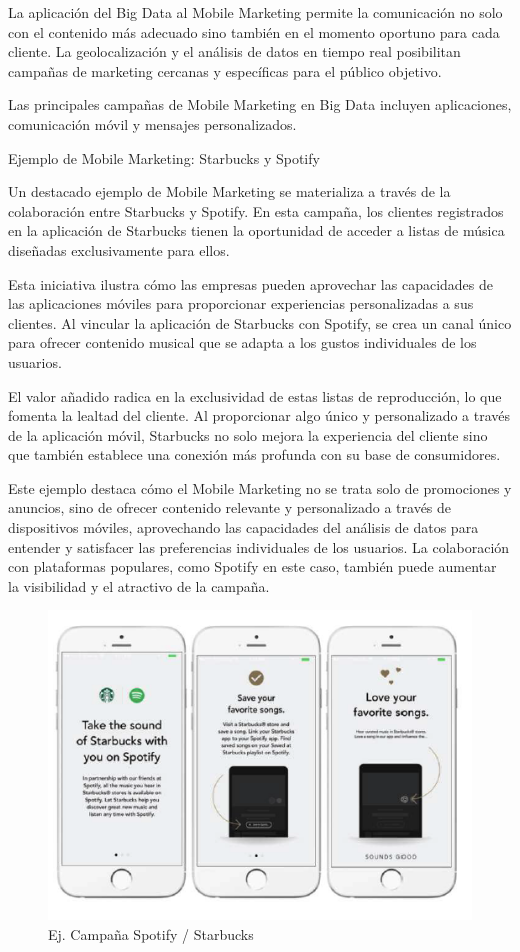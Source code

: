\documentclass[
    a4paper, %
    10pt, %
    unnumberedsections, %
    twoside, %
]{LTJournalArticle}
\begin{document}
La aplicación del Big Data al Mobile Marketing permite la comunicación no solo con el contenido más adecuado sino también en el momento oportuno para cada cliente. La geolocalización y el análisis de datos en tiempo real posibilitan campañas de marketing cercanas y específicas para el público objetivo.

Las principales campañas de Mobile Marketing en Big Data incluyen aplicaciones, comunicación móvil y mensajes personalizados.


Ejemplo de Mobile Marketing: Starbucks y Spotify

Un destacado ejemplo de Mobile Marketing se materializa a través de la colaboración entre Starbucks y Spotify. En esta campaña, los clientes registrados en la aplicación de Starbucks tienen la oportunidad de acceder a listas de música diseñadas exclusivamente para ellos.

Esta iniciativa ilustra cómo las empresas pueden aprovechar las capacidades de las aplicaciones móviles para proporcionar experiencias personalizadas a sus clientes. Al vincular la aplicación de Starbucks con Spotify, se crea un canal único para ofrecer contenido musical que se adapta a los gustos individuales de los usuarios.

El valor añadido radica en la exclusividad de estas listas de reproducción, lo que fomenta la lealtad del cliente. Al proporcionar algo único y personalizado a través de la aplicación móvil, Starbucks no solo mejora la experiencia del cliente sino que también establece una conexión más profunda con su base de consumidores.

Este ejemplo destaca cómo el Mobile Marketing no se trata solo de promociones y anuncios, sino de ofrecer contenido relevante y personalizado a través de dispositivos móviles, aprovechando las capacidades del análisis de datos para entender y satisfacer las preferencias individuales de los usuarios. La colaboración con plataformas populares, como Spotify en este caso, también puede aumentar la visibilidad y el atractivo de la campaña.



\begin{figure}[h]
  \centering
  \includegraphics[width=0.7\linewidth]{./images/spostar.jpg}
  \caption{Ej. Campaña Spotify / Starbucks}
  \label{fig:etiqueta}
\end{figure}
\end{document}
